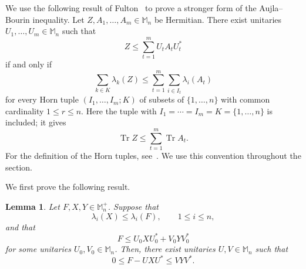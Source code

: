 \documentclass[11pt]{amsart}
\numberwithin{equation}{section}
\newtheorem{lemma}[theorem]{Lemma}
\newcommand{\Mn}{\mathbb M_n}
\newcommand{\Mnp}{\mathbb M_n^+}
\newcommand{\Tr}{\operatorname{Tr}}
\begin{document}
We use the following result of Fulton~\cite{Fulton} to prove
a stronger form of the Aujla--Bourin inequality.
Let $Z,A_1,\ldots,A_m\in\Mn$ be Hermitian.
There exist unitaries $U_1,\ldots,U_m\in\Mn$ such that
\[
 Z\leq\sum_{t=1}^m U_tA_tU_t^*
\]
if and only if
\[
 \sum_{k\in K}\lambda_k(Z)
 \leq
 \sum_{t=1}^m\sum_{i\in I_t}\lambda_i(A_t)
\]
for every Horn tuple $(I_1,\ldots,I_m;K)$ of subsets of
$\{1,\ldots,n\}$ with common cardinality $1\leq r\leq n$.
Here the tuple with
$I_1=\cdots=I_m=K=\{1,\ldots,n\}$ is included; it gives
\[
 \Tr Z\leq\sum_{t=1}^m\Tr A_t.
\]
For the definition of the Horn tuples, see~\cite[Section~2]{Fulton}.
We use this convention throughout the section.

We first prove the following result.

\begin{lemma}\label{lem:completion}
Let \(F,X,Y\in\Mnp\). Suppose that
\[
    \lambda_i(X)\leq\lambda_i(F),
    \qquad 1\leq i\leq n,
\]
and that
\[
    F\leq U_0 X U_0^*+V_0 Y V_0^*
\]
for some unitaries \(U_0,V_0\in\Mn\).
Then, there exist unitaries \(U,V\in\Mn\) such that
\begin{equation}\label{eq:completion}
    0\leq F-UXU^*\leq VYV^*.
\end{equation}
\end{lemma}
\end{document}

